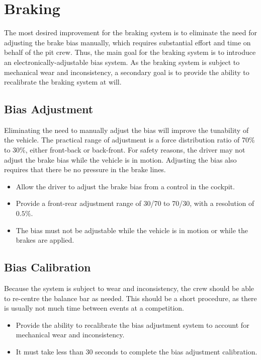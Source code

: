 \section{Braking}

The most desired improvement for the braking system is to eliminate the need for adjusting the brake bias manually, which requires substantial effort and time on behalf of the pit crew. Thus, the main goal for the braking system is to introduce an electronically-adjustable bias system. As the braking system is subject to mechanical wear and inconsistency, a secondary goal is to provide the ability to recalibrate the braking system at will.

\subsection{Bias Adjustment}

Eliminating the need to manually adjust the bias will improve the tunability of the vehicle. The practical range of adjustment is a force distribution ratio of 70\% to 30\%, either front-back or back-front. For safety reasons, the driver may not adjust the brake bias while the vehicle is in motion. Adjusting the bias also requires that there be no pressure in the brake lines.

\begin{itemize}

\item Allow the driver to adjust the brake bias from a control in the cockpit.
\item Provide a front-rear adjustment range of 30/70 to 70/30, with a resolution of $0.5\%$.
\item The bias must not be adjustable while the vehicle is in motion or while the brakes are applied.

\end{itemize}

\subsection{Bias Calibration}

Because the system is subject to wear and inconsistency, the crew should be able to re-centre the balance bar as needed. This should be a short procedure, as there is usually not much time between events at a competition.

\begin{itemize}

\item Provide the ability to recalibrate the bias adjustment system to account for mechanical wear and inconsistency. 
\item It must take less than 30 seconds to complete the bias adjustment calibration.

\end{itemize}
